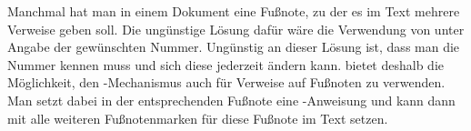 \begin{Declaration}
\end{Declaration}
Manchmal%
hat man in einem Dokument eine Fußnote, zu der es im Text mehrere Verweise
geben soll. Die ungünstige Lösung dafür wäre die Verwendung von
 unter Angabe der gewünschten
Nummer. Ungünstig an dieser Lösung ist, dass man die Nummer kennen muss und
sich diese jederzeit ändern kann. \KOMAScript{} bietet deshalb die
Möglichkeit, den
-Mechanismus auch für
Verweise auf Fußnoten zu verwenden. Man setzt dabei in der entsprechenden
Fußnote eine -Anweisung und kann dann mit  alle
weiteren Fußnotenmarken für diese Fußnote im Text setzen.
%
